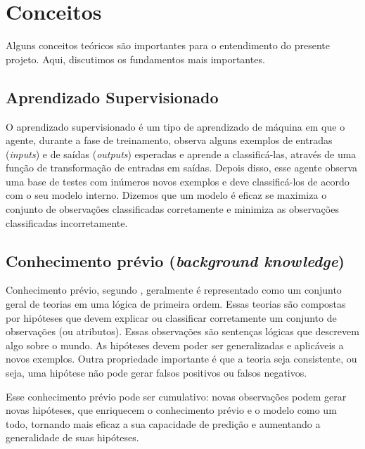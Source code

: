 \chapter{Conceitos}
\label{cap:conceitos}

Alguns conceitos teóricos são importantes para o entendimento do presente projeto. Aqui, discutimos os fundamentos mais importantes.

\section{Aprendizado Supervisionado}
\label{sec:fundamentos}

O aprendizado supervisionado é um tipo de aprendizado de máquina em que o agente, durante a fase de treinamento, observa alguns exemplos de entradas (\textit{inputs}) e de saídas (\textit{outputs}) esperadas e aprende a classificá-las, através de uma função de transformação de entradas em saídas. Depois disso, esse agente observa uma base de testes com inúmeros novos exemplos e deve classificá-los de acordo com o seu modelo interno. Dizemos que um modelo é eficaz se maximiza o conjunto de observações classificadas corretamente e minimiza as observações classificadas incorretamente.


\section{Conhecimento prévio (\textit{background knowledge})}
\label{sec:fundamentos}

Conhecimento prévio, segundo \citet[capítulo 19]{AIMA}, geralmente é representado como um conjunto geral de teorias em uma lógica de primeira ordem. Essas teorias são compostas por hipóteses que devem explicar ou classificar corretamente um conjunto de observações (ou atributos). Essas observações são sentenças lógicas que descrevem algo sobre o mundo. As hipóteses devem poder ser generalizadas e  aplicáveis a novos exemplos. Outra propriedade importante é que a teoria seja consistente, ou seja, uma hipótese não pode gerar falsos positivos ou falsos negativos.

Esse conhecimento prévio pode ser cumulativo: novas observações podem gerar novas hipóteses, que enriquecem o conhecimento prévio e o modelo como um todo, tornando mais eficaz a sua capacidade de predição e aumentando a generalidade de suas hipóteses.


